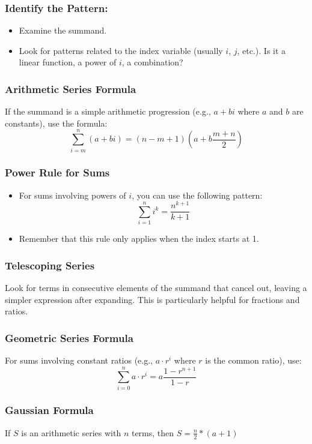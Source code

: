 \subsubsection{Identify the Pattern:}
\begin{itemize}
    \item Examine the summand.
    \item Look for patterns related to the index variable (usually $i$, $j$, etc.). Is it a linear function, a power of $i$, a combination?
\end{itemize}


\subsubsection{Arithmetic Series Formula}
If the summand is a simple arithmetic progression (e.g., $a + bi$ where $a$ and $b$ are constants), use the formula:
\[
    \sum_{i=m}^{n} (a + bi) = (n - m + 1)\left(a + b\frac{m + n}{2}\right)
\]


\subsubsection{Power Rule for Sums}
\begin{itemize}
    \item For sums involving powers of $i$, you can use the following pattern:
          \[
              \sum_{i=1}^{n} i^k = \frac{n^{k+1}}{k+1}
          \]
    \item Remember that this rule only applies when the index starts at 1.
\end{itemize}


\subsubsection{Telescoping Series}
Look for terms in consecutive elements of the summand that cancel out, leaving a simpler expression after expanding. This is particularly helpful for fractions and ratios.


\subsubsection{Geometric Series Formula}
For sums involving constant ratios (e.g., $a \cdot r^i$ where $r$ is the common ratio), use:
\[
    \sum_{i=0}^{n} a \cdot r^i = a \frac{1 - r^{n+1}}{1-r}
\]


\subsubsection{Gaussian Formula}
If $S$ is an arithmetic series with $n$ terms, then $S = \frac{n}{2} * (a + 1)$


